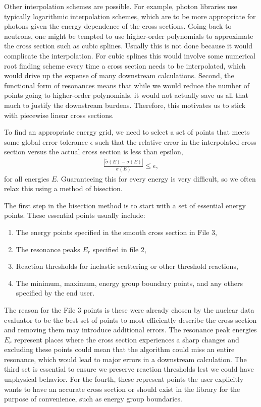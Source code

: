 Other interpolation schemes are possible. For example, photon libraries use typically logarithmic interpolation schemes, which are to be more appropriate for photons given the energy dependence of the cross sections. Going back to neutrons, one might be tempted to use higher-order polynomials to approximate the cross section such as cubic splines. Usually this is not done because it would complicate the interpolation. For cubic splines this would involve some numerical root finding scheme every time a cross section needs to be interpolated, which would drive up the expense of many downstream calculations. Second, the functional form of resonances means that while we would reduce the number of points going to higher-order polynomials, it would not actually save us all that much to justify the downstream burdens. Therefore, this motivates us to stick with piecewise linear cross sections.

To find an appropriate energy grid, we need to select a set of points that meets some global error tolerance $\epsilon$ such that the relative error in the interpolated cross section versus the actual cross section is less than epsilon,
\begin{align}
  \frac{ | \widetilde{\sigma}(E) - \sigma(E) | }{ \sigma(E) } \le \epsilon ,
\end{align}
for all energies $E$. Guaranteeing this for every energy is very difficult, so we often relax this using a method of bisection.

The first step in the bisection method is to start with a set of essential energy points. These essential points usually include:
\begin{enumerate}
  \item The energy points specified in the smooth cross section in File 3,
  \item The resonance peaks $E_r$ specified in file 2,
  \item Reaction thresholds for inelastic scattering or other threshold reactions,
  \item The minimum, maximum, energy group boundary points, and any others specified by the end user.
\end{enumerate}
The reason for the File 3 points is these were already chosen by the nuclear data evaluator to be the best set of points to most efficiently describe the cross section and removing them may introduce additional errors. The resonance peak energies $E_r$ represent places where the cross section experiences a sharp changes and excluding these points could mean that the algorithm could miss an entire resonance, which would lead to major errors in a downstream calculation. The third set is essential to ensure we preserve reaction thresholds lest we could have unphysical behavior. For the fourth, these represent points the user explicitly wants to have an accurate cross section or should exist in the library for the purpose of convenience, such as energy group boundaries.

